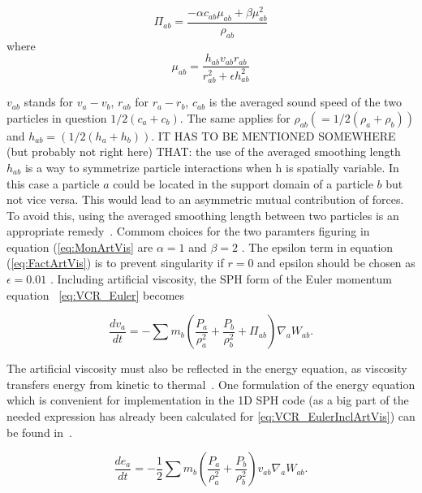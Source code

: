 \documentclass{report}
\begin{document}
\begin{equation}
\label{eq:MonArtVis}
\Pi_{\mathit{ab}}= \frac{-\alpha c_{\mathit{ab}}\mu_{ab}+\beta \mu_{ab}^2}{\rho_{ab}}
\end{equation}
where 
\begin{equation}
\label{eq:FactArtVis}
\mu_{ab}=\frac{h_{ab}v_{ab}r_{ab}}{r_{ab}^2+\epsilon h_{ab}^2}
\end{equation}

$v_{ab}$ stands for $v_a-v_b$, $r_{ab}$ for $r_a-r_b$, $c_{ab}$ is the
averaged sound speed of the two particles in question $1/2(c_a+c_b)$. The same
applies for $\rho_{ab}(=1/2(\rho_a+\rho_b))$ and $h_{ab}=(1/2(h_a+h_b))$. IT
HAS TO BE MENTIONED SOMEWHERE (but probably not right here) THAT: the use of
the averaged smoothing length $h_{ab}$ is a way to symmetrize particle
interactions when h is spatially variable. In this case a particle $a$ could be
located in the support domain of a particle $b$ but not vice versa. This would
lead to an asymmetric mutual contribution of forces. To avoid this, using the
averaged smoothing length between two particles is an appropriate remedy~\cite{Liu2003}.
Commom choices for the two paramters figuring in equation (\ref{eq:MonArtVis} are $\alpha=1$ and $\beta=2$ \cite{Monaghan1992}. The epsilon term in equation (\ref{eq:FactArtVis}) is to prevent singularity if $r=0$ and epsilon should be chosen as $\epsilon=0.01$ \cite{Monaghan1992}.
Including artificial viscosity, the SPH form of the Euler momentum equation ~\ref{eq:VCR_Euler} becomes~\cite{Monaghan2005}

\begin{equation}
\label{eq:VCR_EulerInclArtVis}
\frac{dv_{a}}{\mathit{dt}}=-\sum {m_{b}\left(\frac{P_{a}}{\rho_{a}^{2}}+\frac{P_{b}}{\rho _{b}^{2}}+\Pi _{ab}\right)\nabla_{a}W_{ab}}.
\end{equation}

The artificial viscosity must also be reflected in the energy equation, as viscosity 
transfers energy from kinetic to thermal~\cite{Monaghan2005}. One formulation of the 
energy equation which is convenient for implementation in the 1D SPH code (as a big 
part of the needed expression has already been calculated for 
\ref{eq:VCR_EulerInclArtVis}) can be found in~\cite{Liu2003}.

\begin{equation}
\label{eq:ECR_EulerInclArtVis}
\frac{de_{a}}{\mathit{dt}}=-\mathit{}\frac{1}{2}\sum{m_{b}\left(\frac{P_{a}}{\rho _{a}^{2}}+\frac{P_{b}}{\rho _{b}^{2}}\right)v_{\mathit{ab}}\nabla _{a}W_{\mathit{ab}}}.
\end{equation}
\end{document}
